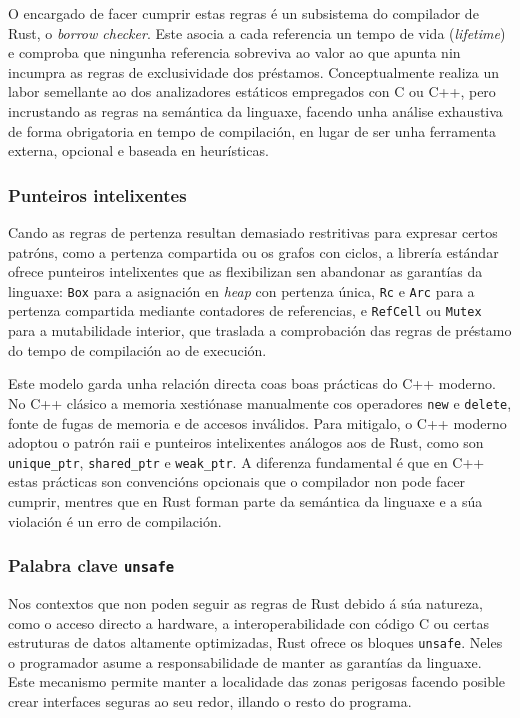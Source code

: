 O encargado de facer cumprir estas regras é un subsistema do compilador de Rust,
o \textit{borrow checker}.
Este asocia a cada referencia un tempo de vida (\textit{lifetime})
e comproba que ningunha referencia sobreviva ao valor ao que apunta
nin incumpra as regras de exclusividade dos préstamos.
Conceptualmente realiza un labor semellante ao dos analizadores estáticos empregados con C ou C++,
pero incrustando as regras na semántica da linguaxe,
facendo unha análise exhaustiva de forma obrigatoria en tempo de compilación,
en lugar de ser unha ferramenta externa, opcional e baseada en heurísticas.

\subsubsection{Punteiros intelixentes}
Cando as regras de pertenza resultan demasiado restritivas para expresar certos patróns,
como a pertenza compartida ou os grafos con ciclos,
a librería estándar ofrece punteiros intelixentes que as flexibilizan
sen abandonar as garantías da linguaxe:
\texttt{Box} para a asignación en \textit{heap} con pertenza única,
\texttt{Rc} e \texttt{Arc} para a pertenza compartida mediante contadores de referencias,
e \texttt{RefCell} ou \texttt{Mutex} para a mutabilidade interior,
que traslada a comprobación das regras de préstamo do tempo de compilación ao de execución.

Este modelo garda unha relación directa coas boas prácticas do C++ moderno.
No C++ clásico a memoria xestiónase manualmente cos operadores \texttt{new} e \texttt{delete},
fonte de fugas de memoria e de accesos inválidos.
Para mitigalo, o C++ moderno adoptou o patrón \acrshort{raii}
e punteiros intelixentes análogos aos de Rust, como son 
\texttt{unique\_ptr}, \texttt{shared\_ptr} e \texttt{weak\_ptr}.
A diferenza fundamental é que en C++ estas prácticas son convencións opcionais
que o compilador non pode facer cumprir,
mentres que en Rust forman parte da semántica da linguaxe
e a súa violación é un erro de compilación.

\subsubsection{Palabra clave \texttt{unsafe}}
Nos contextos que non poden seguir as regras de Rust debido á súa natureza,
como o acceso directo a hardware, a interoperabilidade con código C
ou certas estruturas de datos altamente optimizadas,
Rust ofrece os bloques \texttt{unsafe}.
Neles o programador asume a responsabilidade de manter as garantías da linguaxe.
Este mecanismo permite manter a localidade das zonas perigosas
facendo posible crear interfaces seguras ao seu redor, illando o resto do programa.



